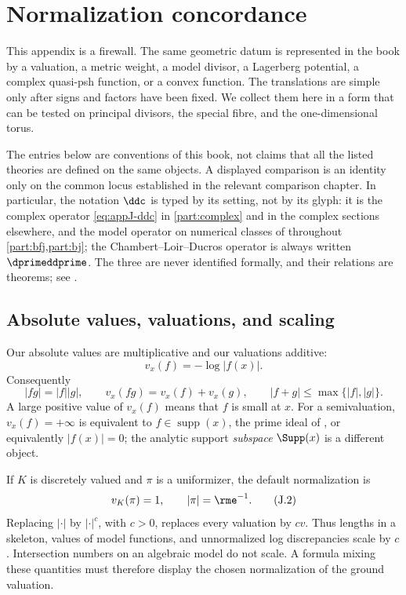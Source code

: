 \chapter{Normalization concordance}
\label{app:normalizations}

This appendix is a firewall.  The same geometric datum is represented in the
book by a valuation, a metric weight, a model divisor, a Lagerberg potential,
a complex quasi-psh function, or a convex function.  The translations are
simple only after signs and factors have been fixed.  We collect them here in
a form that can be tested on principal divisors, the special fibre, and the
one-dimensional torus.

The entries below are conventions of this book, not claims that all the
listed theories are defined on the same objects.  A displayed comparison is
an identity only on the common locus established in the relevant comparison
chapter.  In particular, the notation \(\ddc\) is typed by its setting, not by its
glyph: it is the complex operator \eqref{eq:appJ-ddc} in
\cref{part:complex} and in the complex sections elsewhere, and the model
operator on numerical classes of  throughout
\cref{part:bfj,part:bj}; the Chambert--Loir--Ducros operator is always
written \(\dprimeddprime\).  The three are never identified formally, and
their relations are theorems; see
.

\section{Absolute values, valuations, and scaling}
\label{sec:appJ-valuations}

Our absolute values are multiplicative and our valuations additive:
\begin{equation*}
 v_x(f)=-\log|f(x)|.
 \tag{J.1}\label{eq:appJ-valuation-sign}
\end{equation*}
Consequently
\[
 |fg|=|f||g|,
 \qquad
 v_x(fg)=v_x(f)+v_x(g),
 \qquad
 |f+g|\leq\max\{|f|,|g|\}.
\]
A large positive value of \(v_x(f)\) means that \(f\) is small at \(x\).
For a semivaluation, \(v_x(f)=+\infty\) is equivalent to
\(f\in\operatorname{supp}(x)\), the prime ideal of
, or equivalently \(|f(x)|=0\); the
analytic support \emph{subspace} \(\Supp(x)\) is a different object.

If \(K\) is discretely valued and \(\pi\) is a uniformizer, the default
normalization is
\begin{equation*}
 v_K(\pi)=1,
 \qquad |\pi|=\rme^{-1}.
 \tag{J.2}\label{eq:appJ-uniformizer}
\end{equation*}
Replacing \(|\cdot|\) by \(|\cdot|^c\), with \(c>0\), replaces every
valuation by \(cv\).  Thus lengths in a skeleton, values of model functions,
and unnormalized log discrepancies scale by \(c\).  Intersection numbers on
an algebraic model do not scale.  A formula mixing these quantities must
therefore display the chosen normalization of the ground valuation.

